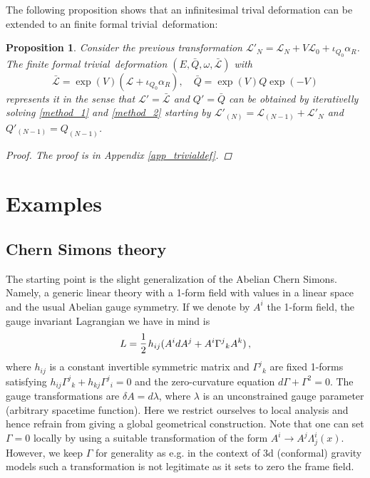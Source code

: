 \documentclass[a4paper,12pt]{article}
\numberwithin{equation}{section} %
\newcommand{\half}{\mathchoice{%
    \ffrac{1}{2}}{\frac{1}{2}}{\frac{1}{2}}{\frac{1}{2}}}
\newcommand{\ffrac}[2]{\raisebox{.5pt}%
  {\footnotesize$\displaystyle\frac{#1}{#2}$}\kern1pt}
\def\cL{\mathcal{L}}
\newcommand{\h}{\cL}
\newtheorem{proposition}[thm]{Proposition}
\begin{document}
The following proposition shows that an infinitesimal trival deformation can be extended to an finite formal trivial\ deformation:

\begin{proposition}
	\label{prop_triv_def}
	Consider the previous transformation $\h'_N = \h_N + V \h_0 + \iota_{Q_0}\alpha_R$. The finite formal trivial\ deformation $(E,\bar{Q},\omega,\bar{\h})$ with
	\begin{equation}
		\label{eq_prop_triv}
		\bar{\h} = \exp(V)(\h + \iota_{Q_0}\alpha_R), \quad	\bar{Q} = \exp(V) Q \exp(-V)
	\end{equation}
	represents it in the sense that $\h' = \bar{\h}$ and $Q' = \bar{Q}$ can be obtained by iterativelly solving \eqref{method_1} and \eqref{method_2} starting by $\h'_{(N)} = \h_{(N-1)} + \h'_N$ and $Q'_{(N-1)} = Q_{(N-1)}$.
	\begin{proof}
		The proof is in Appendix \ref{app_trivialdef}.
	\end{proof}
\end{proposition}
\fi


\section{Examples}

\label{sec:applications}
\subsection{Chern Simons theory}
The starting point is the slight generalization of the Abelian Chern Simons. Namely, a generic linear theory with a 1-form field with values in a linear space and the usual Abelian gauge symmetry. If we denote by $A^i$ the 1-form field, the gauge invariant Lagrangian we have in mind is
\begin{equation}
    L=\half h_{ij}(A^idA^j+A^i\Gamma^j{}_kA^k)\,,
\end{equation}
where $h_{ij}$ is a constant invertible symmetric matrix and $\Gamma^j{}_k$ are fixed 1-forms satisfying $h_{ij}\Gamma^j{}_k+h_{kj}\Gamma^j{}_i=0$ and the zero-curvature equation $d\Gamma+\Gamma^2=0$. The gauge transformations are $\delta A=d\lambda$, where $\lambda$ is an unconstrained gauge parameter (arbitrary spacetime function). Here we restrict ourselves to local analysis and hence refrain from giving a global geometrical construction. Note that one can set $\Gamma=0$ locally by using a suitable transformation of the form $A^i\to A^j\Lambda^i_j(x)$. However, we keep
$\Gamma$ for generality as e.g. in the context of 3d (conformal) gravity models such a transformation is not legitimate as it sets to zero the frame field.
\end{document}
